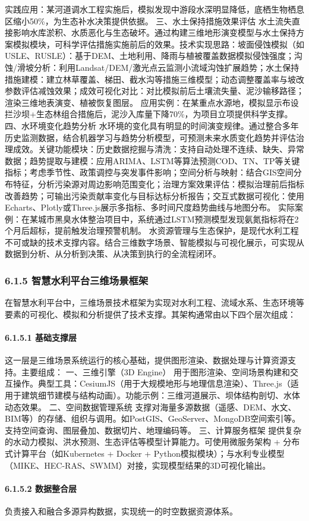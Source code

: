 实践应用：某河道调水工程实施后，模拟发现中游段水深明显降低，底栖生物栖息区缩小50\%，为生态补水决策提供依据。 三、水土保持措施效果评估 水土流失直接影响水库淤积、水质恶化与生态破坏。通过构建三维地形演变模型与水土保持方案模拟模块，可科学评估措施实施前后的效果。技术实现思路：坡面侵蚀模拟（如USLE、RUSLE）：基于DEM、土地利用、降雨与植被覆盖数据模拟侵蚀强度；沟蚀/滑坡分析：利用Landsat/DEM/激光点云监测小流域沟蚀扩展趋势；水土保持措施建模：建立林草覆盖、梯田、截水沟等措施三维模型；动态调整覆盖率与坡改参数评估减蚀效果；成效可视化对比：对比模拟前后土壤流失量、泥沙输移路径；渲染三维地表演变、植被恢复图层。 应用实例：在某重点水源地，模拟显示布设拦沙坝+生态林组合措施后，泥沙入库量下降70\%，为项目立项提供科学支撑。 四、水环境变化趋势分析 水环境的变化具有明显的时间演变规律。通过整合多年历史监测数据，结合机器学习与趋势分析模型，可预测未来水质变化趋势并评估治理成效。关键功能模块：历史数据挖掘与清洗：支持自动处理不连续、缺失、异常数据；趋势提取与建模：应用ARIMA、LSTM等算法预测COD、TN、TP等关键指标；考虑季节性、政策调控与突发事件影响；空间分析与映射：结合GIS空间分布特征，分析污染源对周边影响范围变化；治理方案效果评估：模拟治理前后指标改善趋势；可输出污染贡献率变化与目标达标分析报告；交互式数据可视化：使用Echarts、Plotly或Three.js展示多指标、多时间尺度趋势曲线与地图分布。 实际案例：在某城市黑臭水体整治项目中，系统通过LSTM预测模型发现氨氮指标将在2个月后超标，提前触发治理预警机制。 水资源管理与生态保护，是现代水利工程不可或缺的技术支撑内容。结合三维数字场景、智能模拟与可视化展示，可实现从数据到分析、从分析到决策、从决策到执行的全流程闭环。 \subsubsection{6.1.5 智慧水利平台三维场景框架}\label{ux667aux6167ux6c34ux5229ux5e73ux53f0ux4e09ux7ef4ux573aux666fux6846ux67b6} 在智慧水利平台中，三维场景技术框架为实现对水利工程、流域水系、生态环境等要素的可视化、模拟和分析提供了技术支撑。其架构通常由以下四个层次组成： \paragraph{6.1.5.1 基础支撑层}\label{ux57faux7840ux652fux6491ux5c42} 这一层是三维场景系统运行的核心基础，提供图形渲染、数据处理与计算资源支持。主要组成： 一、三维引擎（3D Engine） 用于图形渲染、空间场景构建和交互操作。典型工具：CesiumJS（用于大规模地形与地理信息渲染）、Three.js（适用于建筑细节建模与结构动画）。功能示例：三维河道展示、坝体结构剖切、水体动态效果。 二、空间数据管理系统 支撑对海量多源数据（遥感、DEM、水文、BIM等）的存储、组织与调用。如PostGIS、GeoServer、MongoDB空间索引等。支持空间查询、图层叠加、数据切片、地理编码等。 三、计算服务框架 提供复杂的水动力模拟、洪水预测、生态评估等模型计算能力。可使用微服务架构 + 分布式计算平台（如Kubernetes + Docker + Python模拟模块）；与水利专业模型（MIKE、HEC-RAS、SWMM）对接，实现模型结果的3D可视化输出。 \paragraph{6.1.5.2 数据整合层}\label{ux6570ux636eux6574ux5408ux5c42} 负责接入和融合多源异构数据，实现统一的时空数据资源体系。 